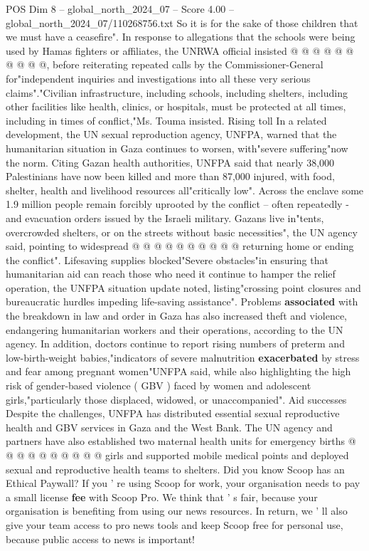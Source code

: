 \begin{textsample}{POS Dim 8 – global\_north\_2024\_07 – Score 4.00 – global\_north\_2024\_07/110268756.txt}
So it is for the sake of those children that we must have a ceasefire".
In response to allegations that the schools were being used by Hamas fighters or affiliates, the UNRWA official insisted @ @ @ @ @ @ @ @ @ @, before reiterating repeated calls by the Commissioner-General for"independent inquiries and investigations into all these very serious claims"."Civilian infrastructure, including schools, including shelters, including other facilities like health, clinics, or hospitals, must be protected at all times, including in times of conflict,"Ms.
Touma insisted.
Rising toll In a related development, the UN sexual reproduction agency, UNFPA, warned that the humanitarian situation in Gaza continues to worsen, with"severe suffering"now the norm.
Citing Gazan health authorities, UNFPA said that nearly 38,000 Palestinians have now been killed and more than 87,000 injured, with food, shelter, health and livelihood resources all"critically low".
Across the enclave some 1.9 million people remain forcibly uprooted by the conflict -- often repeatedly - and evacuation orders issued by the Israeli military.
Gazans live in"tents, overcrowded shelters, or on the streets without basic necessities", the UN agency said, pointing to widespread @ @ @ @ @ @ @ @ @ @ returning home or ending the conflict".
Lifesaving supplies blocked"Severe obstacles"in ensuring that humanitarian aid can reach those who need it continue to hamper the relief operation, the UNFPA situation update noted, listing"crossing point closures and bureaucratic hurdles impeding life-saving assistance".
Problems \textbf{associated} with the breakdown in law and order in Gaza has also increased theft and violence, endangering humanitarian workers and their operations, according to the UN agency.
In addition, doctors continue to report rising numbers of preterm and low-birth-weight babies,"indicators of severe malnutrition \textbf{exacerbated} by stress and fear among pregnant women"UNFPA said, while also highlighting the high risk of gender-based violence ( GBV ) faced by women and adolescent girls,"particularly those displaced, widowed, or unaccompanied".
Aid successes Despite the challenges, UNFPA has distributed essential sexual reproductive health and GBV services in Gaza and the West Bank.
The UN agency and partners have also established two maternal health units for emergency births @ @ @ @ @ @ @ @ @ @ girls and supported mobile medical points and deployed sexual and reproductive health teams to shelters.
Did you know Scoop has an Ethical Paywall?
If you ' re using Scoop for work, your organisation needs to pay a small license \textbf{fee} with Scoop Pro.
We think that ' s fair, because your organisation is benefiting from using our news resources.
In return, we ' ll also give your team access to pro news tools and keep Scoop free for personal use, because public access to news is important!

\end{textsample}
